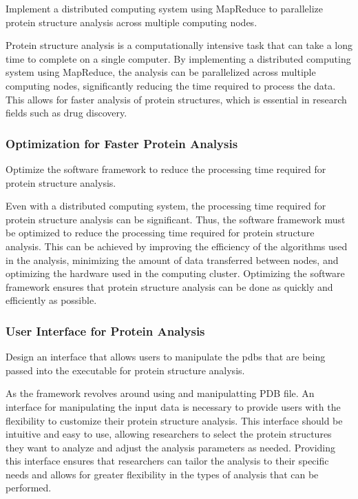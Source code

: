 \documentclass[]{final_report}
\begin{document}
\begin{displayquote}
    Implement a distributed computing system using MapReduce to parallelize protein structure analysis across multiple computing nodes.
\end{displayquote}

Protein structure analysis is a computationally intensive task that can take a long time to complete on a single computer. By implementing a distributed computing system using MapReduce, the analysis can be parallelized across multiple computing nodes, significantly reducing the time required to process the data. This allows for faster analysis of protein structures, which is essential in research fields such as drug discovery.

\subsubsection{Optimization for Faster Protein Analysis}

\begin{displayquote}
    Optimize the software framework to reduce the processing time required for protein structure analysis.
\end{displayquote}

Even with a distributed computing system, the processing time required for protein structure analysis can be significant. Thus, the software framework must be optimized to reduce the processing time required for protein structure analysis. This can be achieved by improving the efficiency of the algorithms used in the analysis, minimizing the amount of data transferred between nodes, and optimizing the hardware used in the computing cluster. Optimizing the software framework ensures that protein structure analysis can be done as quickly and efficiently as possible.
\clearpage

\subsubsection{User Interface for Protein Analysis}

\begin{displayquote}
    Design an interface that allows users to manipulate the pdbs that are being passed into the executable for protein structure analysis.
\end{displayquote}

As the framework revolves around using and manipulatting PDB file. An interface for manipulating the input data is necessary to provide users with the flexibility to customize their protein structure analysis. This interface should be intuitive and easy to use, allowing researchers to select the protein structures they want to analyze and adjust the analysis parameters as needed. Providing this interface ensures that researchers can tailor the analysis to their specific needs and allows for greater flexibility in the types of analysis that can be performed.
\end{document}
